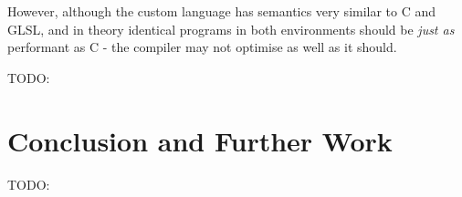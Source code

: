\documentclass[a4paper,12pt,twoside,openright]{report}
\begin{document}
However, although the custom language has semantics very similar to C and GLSL,
and in theory identical programs in both environments should be \textit{just
as} performant as C - the compiler may not optimise as well as it should.

TODO:


\chapter{Conclusion and Further Work}



TODO:

\appendix
\singlespacing



\end{document}
